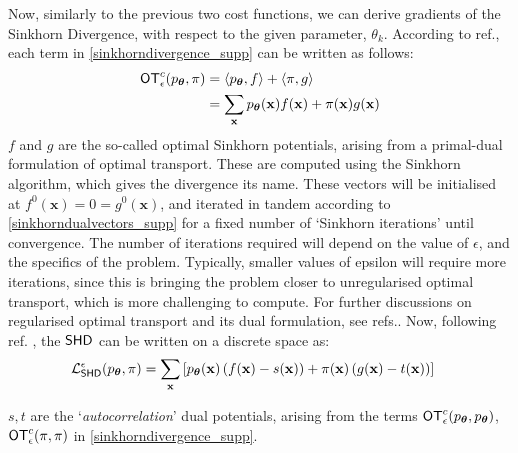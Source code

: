 Now, similarly to the previous two cost functions, we can derive gradients of the Sinkhorn Divergence, with respect to the given parameter, $\theta_k$. According to ref., each term in \eqref{sinkhorndivergence_supp} can be written as follows:
\begin{align}
    \operatorname{\textsf{OT}}^c_\epsilon(p_{\boldsymbol\theta}, \pi) &= \langle p_{\boldsymbol\theta}, f \rangle +  \langle \pi, g \rangle \nonumber \\
    & =\sum\limits_\mathbf{x} p_{\boldsymbol\theta}(\mathbf{x})f(\mathbf{x}) + \pi(\mathbf{x})g(\mathbf{x})
\end{align}
$f$ and $g$ are the so-called optimal Sinkhorn potentials, arising from a primal-dual formulation of optimal transport. These are computed using the Sinkhorn algorithm, which gives the divergence its name. These vectors will be initialised at $f^0(\mathbf{x}) = 0 = g^0(\mathbf{x})$, and iterated in tandem according to \eqref{sinkhorndualvectors_supp} for a fixed number of `Sinkhorn iterations' until convergence. The number of iterations required will depend on the value of $\epsilon$, and the specifics of the problem. Typically, smaller values of epsilon will require more iterations, since this is bringing the problem closer to unregularised optimal transport, which is more challenging to compute. For further discussions on regularised optimal transport and its dual formulation, see refs.. Now, following ref. , the $\operatorname{\textsf{SHD}}$ can be written on a discrete space as:
\begin{align}
    \mathcal{L}_{\operatorname{\textsf{SHD}}}^\epsilon(p_{\boldsymbol\theta}, \pi) = \sum\limits_\mathbf{x}& \left[p_{\boldsymbol\theta}(\mathbf{x})\left(f(\mathbf{x}) - s(\mathbf{x})\right)
    + \pi(\mathbf{x})\left(g(\mathbf{x}) - t(\mathbf{x})\right)\right] \label{sinkhorndualformulation_supp}
\end{align}


\noindent $s, t$ are the `\textit{autocorrelation}' dual potentials, arising from the terms $\operatorname{\textsf{OT}}^c_\epsilon(p_{\boldsymbol\theta}, p_{\boldsymbol\theta})$, $\operatorname{\textsf{OT}}^c_\epsilon(\pi, \pi)$ in \eqref{sinkhorndivergence_supp}.


